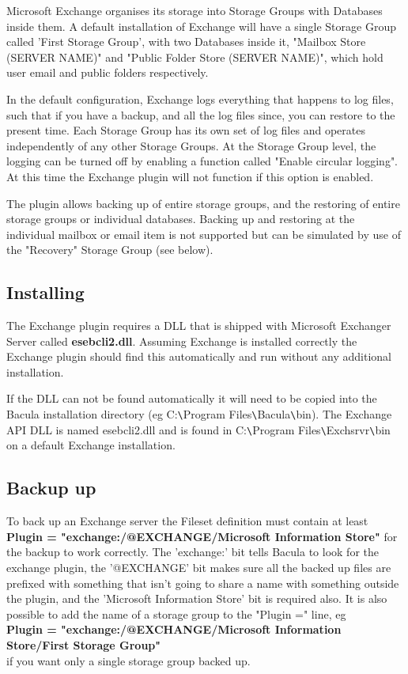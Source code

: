 Microsoft Exchange organises its storage into Storage Groups with
Databases inside them. A default installation of Exchange will have a
single Storage Group called 'First Storage Group', with two Databases
inside it, "Mailbox Store (SERVER NAME)" and 
"Public Folder Store (SERVER NAME)", 
which hold user email and public folders respectively.

In the default configuration, Exchange logs everything that happens to
log files, such that if you have a backup, and all the log files since,
you can restore to the present time. Each Storage Group has its own set
of log files and operates independently of any other Storage Groups. At
the Storage Group level, the logging can be turned off by enabling a
function called "Enable circular logging". At this time the Exchange
plugin will not function if this option is enabled.

The plugin allows backing up of entire storage groups, and the restoring
of entire storage groups or individual databases. Backing up and
restoring at the individual mailbox or email item is not supported but
can be simulated by use of the "Recovery" Storage Group (see below).

\subsection{Installing}
The Exchange plugin requires a DLL that is shipped with Microsoft
Exchanger Server called {\bf esebcli2.dll}. Assuming Exchange is installed
correctly the Exchange plugin should find this automatically and run
without any additional installation.

If the DLL can not be found automatically it will need to be copied into
the Bacula installation
directory (eg C:\verb+\+Program Files\verb+\+Bacula\verb+\+bin). The Exchange API DLL is
named esebcli2.dll and is found in C:\verb+\+Program Files\verb+\+Exchsrvr\verb+\+bin on a
default Exchange installation.

\subsection{Backup up}
To back up an Exchange server the Fileset definition must contain at
least {\bf Plugin = "exchange:/@EXCHANGE/Microsoft Information Store"} for
the backup to work correctly. The 'exchange:' bit tells Bacula to look
for the exchange plugin, the '@EXCHANGE' bit makes sure all the backed
up files are prefixed with something that isn't going to share a name
with something outside the plugin, and the 'Microsoft Information Store'
bit is required also. It is also possible to add the name of a storage
group to the "Plugin =" line, eg \\
{\bf Plugin = "exchange:/@EXCHANGE/Microsoft Information Store/First Storage Group"} \\
if you want only a single storage group backed up.

